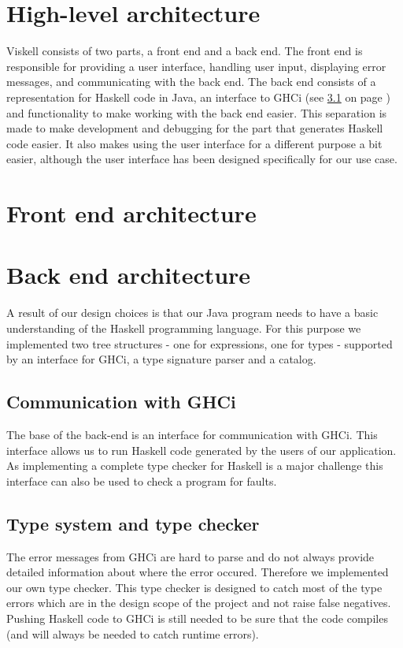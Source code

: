 \section{High-level architecture}

Viskell consists of two parts, a front end and a back end.
The front end is responsible for providing a user interface, handling user input, displaying error messages, and communicating with the back end.
The back end consists of a representation for Haskell code in Java, an interface to GHCi (see \ref{GHCi} on page \pageref{GHCi}) and functionality to make working with the back end easier.
This separation is made to make development and debugging for the part that generates Haskell code easier.
It also makes using the user interface for a different purpose a bit easier, although the user interface has been designed specifically for our use case.

\section{Front end architecture}

\section{Back end architecture}

A result of our design choices is that our Java program needs to have a basic understanding of the Haskell programming
language. For this purpose we implemented two tree structures - one for expressions, one for types - supported by an
interface for GHCi, a type signature parser and a catalog.

\subsection{Communication with GHCi}
\label{GHCi}

The base of the back-end is an interface for communication with GHCi. This interface allows us to run Haskell code
generated by the users of our application. As implementing a complete type checker for Haskell is a major challenge this
interface can also be used to check a program for faults.

\subsection{Type system and type checker}

The error messages from GHCi are hard to parse and do not always provide detailed information about where the error
occured. Therefore we implemented our own type checker. This type checker is designed to catch most of the type errors
which are in the design scope of the project and not raise false negatives. Pushing Haskell code to GHCi is still needed
to be sure that the code compiles (and will always be needed to catch runtime errors).

